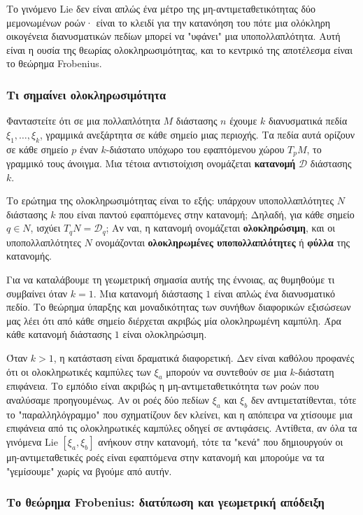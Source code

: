 \documentclass[12pt]{article}
\begin{document}
Το γινόμενο Lie δεν είναι απλώς ένα μέτρο της μη-αντιμεταθετικότητας δύο μεμονωμένων ροών· είναι το κλειδί για την κατανόηση του πότε μια ολόκληρη οικογένεια διανυσματικών πεδίων μπορεί να "υφάνει" μια υποπολλαπλότητα. Αυτή είναι η ουσία της θεωρίας ολοκληρωσιμότητας, και το κεντρικό της αποτέλεσμα είναι το θεώρημα Frobenius.

\subsubsection{Τι σημαίνει ολοκληρωσιμότητα}

Φανταστείτε ότι σε μια πολλαπλότητα $M$ διάστασης $n$ έχουμε $k$ διανυσματικά πεδία $\xi_1, \dots, \xi_k$, γραμμικά ανεξάρτητα σε κάθε σημείο μιας περιοχής. Τα πεδία αυτά ορίζουν σε κάθε σημείο $p$ έναν $k$-διάστατο υπόχωρο του εφαπτόμενου χώρου $T_pM$, το γραμμικό τους άνοιγμα. Μια τέτοια αντιστοίχιση ονομάζεται \textbf{κατανομή} $\mathcal{D}$ διάστασης $k$.

Το ερώτημα της ολοκληρωσιμότητας είναι το εξής: υπάρχουν υποπολλαπλότητες $N$ διάστασης $k$ που είναι παντού εφαπτόμενες στην κατανομή; Δηλαδή, για κάθε σημείο $q \in N$, ισχύει $T_q N = \mathcal{D}_q$; Αν ναι, η κατανομή ονομάζεται \textbf{ολοκληρώσιμη}, και οι υποπολλαπλότητες $N$ ονομάζονται \textbf{ολοκληρωμένες υποπολλαπλότητες} ή \textbf{φύλλα} της κατανομής.

Για να καταλάβουμε τη γεωμετρική σημασία αυτής της έννοιας, ας θυμηθούμε τι συμβαίνει όταν $k=1$. Μια κατανομή διάστασης $1$ είναι απλώς ένα διανυσματικό πεδίο. Το θεώρημα ύπαρξης και μοναδικότητας των συνήθων διαφορικών εξισώσεων μας λέει ότι από κάθε σημείο διέρχεται ακριβώς μία ολοκληρωμένη καμπύλη. Άρα κάθε κατανομή διάστασης $1$ είναι ολοκληρώσιμη.

Όταν $k > 1$, η κατάσταση είναι δραματικά διαφορετική. Δεν είναι καθόλου προφανές ότι οι ολοκληρωτικές καμπύλες των $\xi_a$ μπορούν να συντεθούν σε μια $k$-διάστατη επιφάνεια. Το εμπόδιο είναι ακριβώς η μη-αντιμεταθετικότητα των ροών που αναλύσαμε προηγουμένως. Αν οι ροές δύο πεδίων $\xi_a$ και $\xi_b$ δεν αντιμετατίθενται, τότε το "παραλληλόγραμμο" που σχηματίζουν δεν κλείνει, και η απόπειρα να χτίσουμε μια επιφάνεια από τις ολοκληρωτικές καμπύλες οδηγεί σε αντιφάσεις. Αντίθετα, αν όλα τα γινόμενα Lie $[\xi_a, \xi_b]$ ανήκουν στην κατανομή, τότε τα "κενά" που δημιουργούν οι μη-αντιμεταθετικές ροές είναι εφαπτόμενα στην κατανομή και μπορούμε να τα "γεμίσουμε" χωρίς να βγούμε από αυτήν.

\subsubsection{Το θεώρημα Frobenius: διατύπωση και γεωμετρική απόδειξη}
\end{document}
